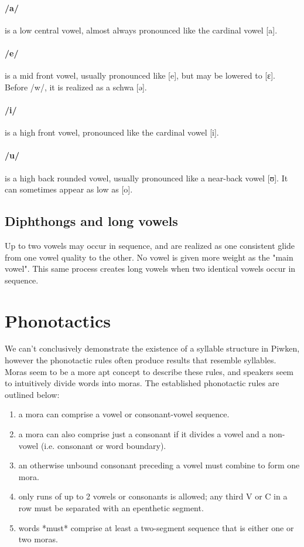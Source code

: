 \documentclass[smallroyalvopaper,9pt]{memoir}
\newcommand{\langeng}{Piwken}
\begin{document}
\paragraph{/a/} is a low central vowel, almost always pronounced like the cardinal vowel [a]. 

\paragraph{/e/} is a mid front vowel, usually pronounced like [e], but may be lowered to [ɛ]. Before /w/, it is realized as a schwa [ə].

\paragraph{/i/} is a high front vowel, pronounced like the cardinal vowel [i].

\paragraph{/u/} is a high back rounded vowel, usually pronounced like a near-back vowel [ʊ]. It can sometimes appear as low as [o].

\subsection{Diphthongs and long vowels}

Up to two vowels may occur in sequence, and are realized as one consistent glide from one vowel quality to the other. No vowel is given more weight as the "main vowel". This same process creates long vowels when two identical vowels occur in sequence.

\section{Phonotactics}

We can't conclusively demonstrate the existence of a syllable structure in \langeng{}, however the phonotactic rules often produce results that resemble syllables. Moras seem to be a more apt concept to describe these rules, and speakers seem to intuitively divide words into moras. The established phonotactic rules are outlined below:

\begin{enumerate}
    \itemsep0em 
    \item a mora can comprise a vowel or consonant-vowel sequence.
    \item a mora can also comprise just a consonant if it divides a vowel and a non-vowel (i.e. consonant or word boundary).
    \item an otherwise unbound consonant preceding a vowel must combine to form one mora.
    \item only runs of up to 2 vowels or consonants is allowed; any third V or C in a row must be separated with an epenthetic segment.
    \item words *must* comprise at least a two-segment sequence that is either one or two moras.
\end{enumerate}
\end{document}
